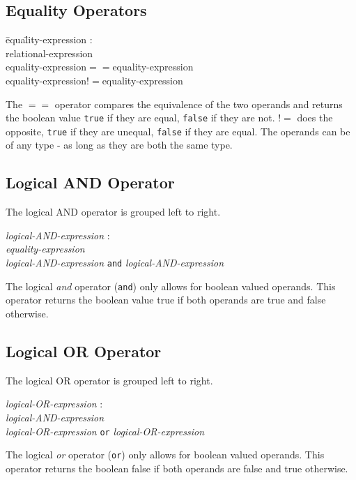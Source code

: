 \documentclass{article}
\begin{document}
\subsection{Equality Operators}
\begin{itshape}
\begin{tabbing}
	\= equa\=lity-expression : \\
		\>\> relational-expression \\
		\>\> equality-expression$==$equality-expression \\		
		\>\> equality-expression$!=$equality-expression
\end{tabbing}
\end{itshape}
The $==$ operator compares the equivalence of the two operands and returns the boolean value \texttt{true} if they are equal, \texttt{false} if they are not. $!=$ does the opposite, \texttt{true} if they are unequal, \texttt{false} if they are equal. The operands can be of any type - as long as they are both the same type.

\subsection{Logical AND Operator}
The logical AND operator is grouped left to right.
\begin{tabbing}
	\= \emph{logi}\=\emph{cal-AND-expression} : \\
		\>\> \emph{equality-expression} \\
		\>\> \emph{logical-AND-expression} \texttt{and} \emph{logical-AND-expression} 
\end{tabbing}
The logical \emph{and} operator (\texttt{and}) only allows for boolean valued operands. This operator returns the boolean value true if both operands are true and false otherwise. 

\subsection{Logical OR Operator}
The logical OR operator is grouped left to right.
\begin{tabbing}
	\= \emph{logi}\=\emph{cal-OR-expression} : \\
		\>\> \emph{logical-AND-expression} \\
		\>\> \emph{logical-OR-expression} \texttt{or} \emph{logical-OR-expression} 
\end{tabbing}
The logical \emph{or} operator (\texttt{or}) only allows for boolean valued operands. This operator returns the boolean false if both operands are false and true otherwise.
\end{document}
